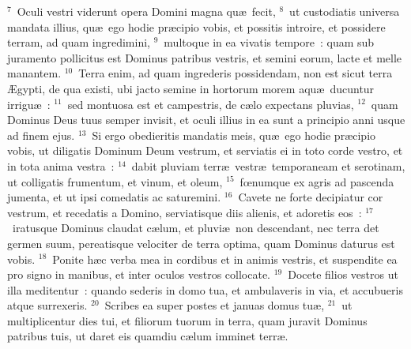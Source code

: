 ${}^{7}$~Oculi vestri viderunt opera Domini magna qu\ae\ fecit,
${}^{8}$~ut custodiatis universa mandata illius, qu\ae\ ego hodie pr\ae cipio vobis, et possitis introire, et possidere terram, ad quam ingredimini,
${}^{9}$~multoque in ea vivatis tempore~: quam sub juramento pollicitus est Dominus patribus vestris, et semini eorum, lacte et melle manantem.
${}^{10}$~Terra enim, ad quam ingrederis possidendam, non est sicut terra \AE gypti, de qua existi, ubi jacto semine in hortorum morem aqu\ae\ ducuntur irrigu\ae~:
${}^{11}$~sed montuosa est et campestris, de c\ae lo expectans pluvias,
${}^{12}$~quam Dominus Deus tuus semper invisit, et oculi illius in ea sunt a principio anni usque ad finem ejus.
${}^{13}$~Si ergo obedieritis mandatis meis, qu\ae\ ego hodie pr\ae cipio vobis, ut diligatis Dominum Deum vestrum, et serviatis ei in toto corde vestro, et in tota anima vestra~:
${}^{14}$~dabit pluviam terr\ae\ vestr\ae\ temporaneam et serotinam, ut colligatis frumentum, et vinum, et oleum,
${}^{15}$~fœnumque ex agris ad pascenda jumenta, et ut ipsi comedatis ac saturemini.
${}^{16}$~Cavete ne forte decipiatur cor vestrum, et recedatis a Domino, serviatisque diis alienis, et adoretis eos~:
${}^{17}$~iratusque Dominus claudat c\ae lum, et pluvi\ae\ non descendant, nec terra det germen suum, pereatisque velociter de terra optima, quam Dominus daturus est vobis.
${}^{18}$~Ponite h\ae c verba mea in cordibus et in animis vestris, et suspendite ea pro signo in manibus, et inter oculos vestros collocate.
${}^{19}$~Docete filios vestros ut illa meditentur~: quando sederis in domo tua, et ambulaveris in via, et accubueris atque surrexeris.
${}^{20}$~Scribes ea super postes et januas domus tu\ae ,
${}^{21}$~ut multiplicentur dies tui, et filiorum tuorum in terra, quam juravit Dominus patribus tuis, ut daret eis quamdiu c\ae lum imminet terr\ae .


